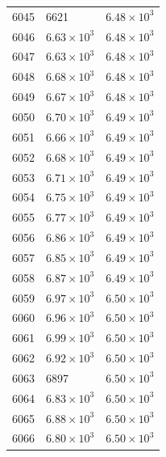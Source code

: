 \begin{table}[H]
\begin{tabular}{lll}
6045 & 6621 & $\displaystyle 6.48 \times 10^{3}$ \\
6046 & $\displaystyle 6.63 \times 10^{3}$ & $\displaystyle 6.48 \times 10^{3}$ \\
6047 & $\displaystyle 6.63 \times 10^{3}$ & $\displaystyle 6.48 \times 10^{3}$ \\
6048 & $\displaystyle 6.68 \times 10^{3}$ & $\displaystyle 6.48 \times 10^{3}$ \\
6049 & $\displaystyle 6.67 \times 10^{3}$ & $\displaystyle 6.48 \times 10^{3}$ \\
6050 & $\displaystyle 6.70 \times 10^{3}$ & $\displaystyle 6.49 \times 10^{3}$ \\
6051 & $\displaystyle 6.66 \times 10^{3}$ & $\displaystyle 6.49 \times 10^{3}$ \\
6052 & $\displaystyle 6.68 \times 10^{3}$ & $\displaystyle 6.49 \times 10^{3}$ \\
6053 & $\displaystyle 6.71 \times 10^{3}$ & $\displaystyle 6.49 \times 10^{3}$ \\
6054 & $\displaystyle 6.75 \times 10^{3}$ & $\displaystyle 6.49 \times 10^{3}$ \\
6055 & $\displaystyle 6.77 \times 10^{3}$ & $\displaystyle 6.49 \times 10^{3}$ \\
6056 & $\displaystyle 6.86 \times 10^{3}$ & $\displaystyle 6.49 \times 10^{3}$ \\
6057 & $\displaystyle 6.85 \times 10^{3}$ & $\displaystyle 6.49 \times 10^{3}$ \\
6058 & $\displaystyle 6.87 \times 10^{3}$ & $\displaystyle 6.49 \times 10^{3}$ \\
6059 & $\displaystyle 6.97 \times 10^{3}$ & $\displaystyle 6.50 \times 10^{3}$ \\
6060 & $\displaystyle 6.96 \times 10^{3}$ & $\displaystyle 6.50 \times 10^{3}$ \\
6061 & $\displaystyle 6.99 \times 10^{3}$ & $\displaystyle 6.50 \times 10^{3}$ \\
6062 & $\displaystyle 6.92 \times 10^{3}$ & $\displaystyle 6.50 \times 10^{3}$ \\
6063 & 6897 & $\displaystyle 6.50 \times 10^{3}$ \\
6064 & $\displaystyle 6.83 \times 10^{3}$ & $\displaystyle 6.50 \times 10^{3}$ \\
6065 & $\displaystyle 6.88 \times 10^{3}$ & $\displaystyle 6.50 \times 10^{3}$ \\
6066 & $\displaystyle 6.80 \times 10^{3}$ & $\displaystyle 6.50 \times 10^{3}$ \\

\end{tabular}
\end{table}
